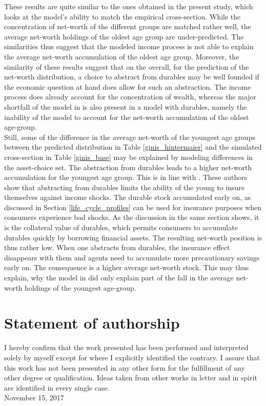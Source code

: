 \documentclass[12pt,a4paper,leqno]{article}
\theoremstyle{definition}
\begin{document}
These results are quite similar to the ones obtained in the present study, which looks at the model's ability to match the empirical cross-section. While the concentration of net-worth of the different groups are matched rather well, the average net-worth holdings of the oldest age group are under-predicted. The similarities thus suggest that the modeled income process is not able to explain the average net-worth accumulation of the oldest age group. Moreover, the similarity of these results suggest that on the overall, for the prediction of the net-worth distribution, a choice to abstract from durables may be well founded if the economic question at hand does allow for such an abstraction. The income process does already account for the concentration of wealth, whereas the major shortfall of the model in \cite{hintermaier2011} is also present in a model with durables, namely the inability of the model to account for the net-worth accumulation of the oldest age-group.\\
Still, some of the difference in the average net-worth of the youngest age groups between the predicted distribution in Table \ref{ginis_hintermaier} and the simulated cross-section in Table \ref{ginis_base} may be explained by modeling differences in the asset-choice set. The abstraction from durables leads to a higher net-worth accumulation for the youngest age group. This is in line with \cite{FV&K2011}. These authors show that abstracting from durables limits the ability of the young to insure themselves against income shocks. The durable stock accumulated early on, as discussed in Section \ref{life_cycle_profiles} can be used for insurance purposes when consumers experience bad shocks. As the discussion in the same section shows, it is the collateral value of durables, which permits consumers to accumulate durables quickly by borrowing financial assets. The resulting net-worth position is thus rather low. When one abstracts from durables, the insurance effect disappears with them and agents need to accumulate more precautionary savings early on. The consequence is a higher average net-worth stock. This may thus explain, why the model in \cite{hintermaier2011} did only explain part of the fall in the average net-worth holdings of the youngest age-group. 

\newpage

\section*{Statement of authorship}
I hereby confirm that the work presented has been performed and interpreted solely by myself except for where I explicitly identified the contrary. I assure that this work has not been presented in any other form for the fulfillment of any other degree or qualification. Ideas taken from other works in letter and in spirit are identified in every single case.
\\[1in] November 15, 2017
\end{document}
